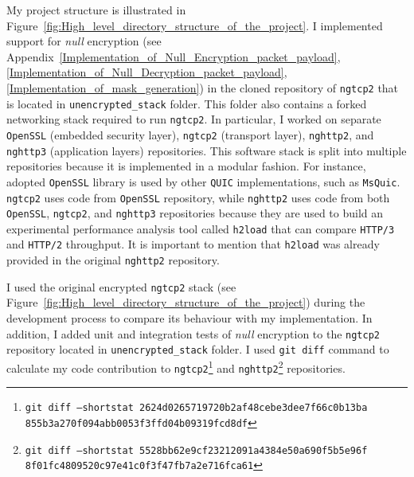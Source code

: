 \documentclass[12pt,a4paper]{report}
\begin{document}
    

My project structure is illustrated in Figure~\ref{fig:High_level_directory_structure_of_the_project}.
I implemented support for \textit{null} encryption (see Appendix~\ref{Implementation_of_Null_Encryption_packet_payload}, \ref{Implementation_of_Null_Decryption_packet_payload}, \ref{Implementation_of_mask_generation}) in the cloned repository of \texttt{ngtcp2} that is located in \texttt{unencrypted\_stack} folder.
This folder also contains a forked networking stack required to run \texttt{ngtcp2}. 
In particular, I worked on separate \texttt{OpenSSL} (embedded security layer), \texttt{ngtcp2} (transport layer), \texttt{nghttp2}, and \texttt{nghttp3} (application layers) repositories.
This software stack is split into multiple repositories because it is implemented in a modular fashion.
For instance, adopted \texttt{OpenSSL} library is used by other \texttt{QUIC} implementations, such as \texttt{MsQuic}.
\texttt{ngtcp2} uses code from \texttt{OpenSSL} repository, while \texttt{nghttp2} uses code from both \texttt{OpenSSL},  \texttt{ngtcp2}, and  \texttt{nghttp3} repositories because they are used to build an experimental performance analysis tool called \texttt{h2load} that can compare \texttt{HTTP/3} and \texttt{HTTP/2} throughput.
It is important to mention that \texttt{h2load} was already provided in the original \texttt{nghttp2} repository.


I used the original encrypted \texttt{ngtcp2} stack (see Figure~\ref{fig:High_level_directory_structure_of_the_project}) during the development process to compare its behaviour with my implementation.
In addition, I added unit and integration tests of \textit{null} encryption to the \texttt{ngtcp2} repository located in \texttt{unencrypted\_stack} folder. 
I used \texttt{git diff} command to calculate my code contribution to \texttt{ngtcp2}\footnote{\texttt{git diff --shortstat 2624d0265719720b2af48cebe3dee7f66c0b13ba 855b3a270f094abb0053f3ffd04b09319fcd8df}} and \texttt{nghttp2}\footnote{\texttt{git diff --shortstat 5528bb62e9cf23212091a4384e50a690f5b5e96f 8f01fc4809520c97e41c0f3f47fb7a2e716fca61}} repositories.
\end{document}
